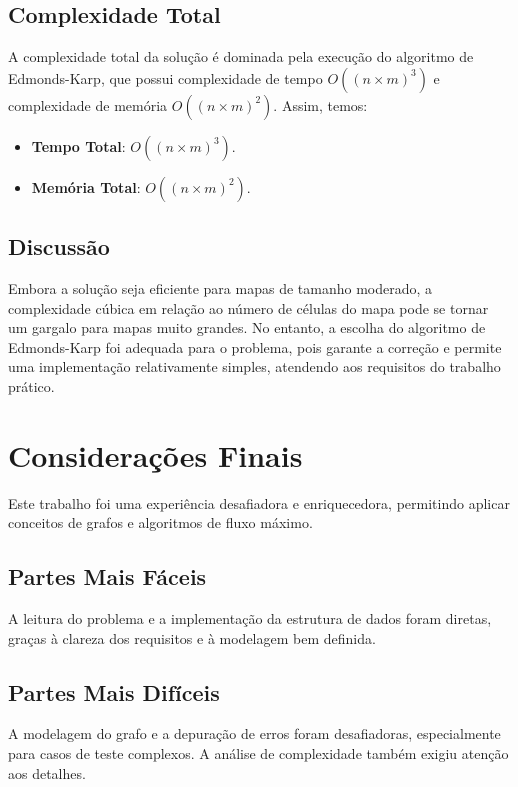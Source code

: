 \documentclass[a4paper,12pt]{article}
\begin{document}
\subsection*{Complexidade Total}

A complexidade total da solução é dominada pela execução do algoritmo de
Edmonds-Karp, que possui complexidade de tempo $O((n \times m)^3)$ e
complexidade de memória $O((n \times m)^2)$. Assim, temos:

\begin{itemize}
    \item \textbf{Tempo Total}: $O((n \times m)^3)$.
    \item \textbf{Memória Total}: $O((n \times m)^2)$.
\end{itemize}

\subsection*{Discussão}

Embora a solução seja eficiente para mapas de tamanho moderado, a complexidade
cúbica em relação ao número de células do mapa pode se tornar um gargalo para
mapas muito grandes. No entanto, a escolha do algoritmo de Edmonds-Karp foi
adequada para o problema, pois garante a correção e permite uma implementação
relativamente simples, atendendo aos requisitos do trabalho prático.

\section*{Considerações Finais}

Este trabalho foi uma experiência desafiadora e enriquecedora, permitindo aplicar conceitos de grafos e algoritmos de fluxo máximo.

\subsection*{Partes Mais Fáceis}
A leitura do problema e a implementação da estrutura de dados foram diretas, graças à clareza dos requisitos e à modelagem bem definida.

\subsection*{Partes Mais Difíceis}
A modelagem do grafo e a depuração de erros foram desafiadoras, especialmente para casos de teste complexos. A análise de complexidade também exigiu atenção aos detalhes.
\end{document}
